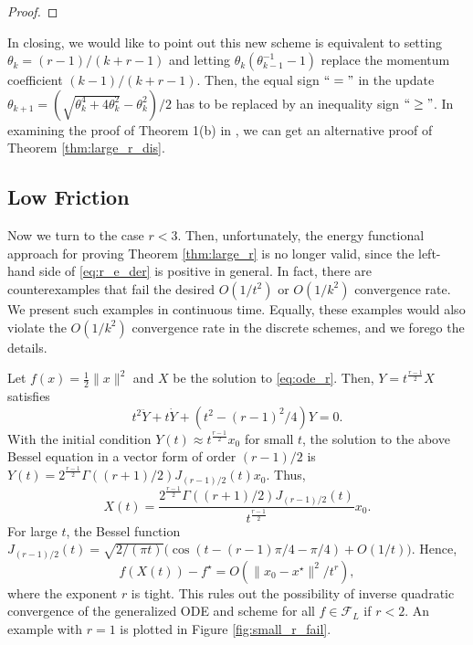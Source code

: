 \documentclass[twoside,11pt]{article}
\begin{document}
\begin{proof}
\end{proof}

In closing, we would like to point out this new scheme is equivalent to setting $\theta_k = (r-1)/(k+r-1)$ and letting $\theta_k(\theta_{k-1}^{-1} - 1)$ replace the momentum coefficient $(k-1)/(k+r-1)$. Then, the equal sign $``="$ in the update $\theta_{k+1} = (\sqrt{\theta_k^4 + 4\theta_k^2} - \theta_k^2 )/2$ has to be replaced by an inequality sign $``\ge"$. In examining the proof of Theorem 1(b) in \cite{tsengapprox}, we can get an alternative proof of Theorem \ref{thm:large_r_dis}.



\subsection{Low Friction}
\label{sec:low-friction}
Now we turn to the case $r < 3$. Then, unfortunately, the energy functional approach for proving Theorem \ref{thm:large_r} is no longer valid, since the left-hand side of \eqref{eq:r_e_der} is positive in general. In fact, there are counterexamples that fail the desired $O(1/t^2)$ or $O(1/k^2)$ convergence rate. We present such examples in continuous time. Equally, these examples would also violate the $O(1/k^2)$ convergence rate in the discrete schemes, and we forego the details.

Let $f(x) = \frac12\|x\|^2$ and $X$ be the solution to \eqref{eq:ode_r}. Then, $Y = t^{\frac{r-1}{2}}X$ satisfies
\begin{equation}\nonumber
t^2\ddot Y + t\dot Y + (t^2 - (r-1)^2/4)Y = 0.
\end{equation}
With the initial condition $Y(t) \approx t^{\frac{r-1}{2}}x_0$ for small $t$, the solution to the above Bessel equation in a vector form of order $(r-1)/2$ is $Y(t) = 2^{\frac{r-1}{2}}\Gamma((r+1)/2)J_{(r-1)/2}(t)x_0$. Thus,
\begin{equation}\nonumber
X(t) = \frac{2^{\frac{r-1}{2}}\Gamma((r+1)/2)J_{(r-1)/2}(t)}{t^{\frac{r-1}{2}}}x_0.
\end{equation}
For large $t$, the Bessel function $J_{(r-1)/2}(t) = \sqrt{2/(\pi t)}\big( \cos(t-(r-1)\pi/4-\pi/4) + O(1/t) \big)$. Hence,
\begin{equation}\nonumber
f(X(t)) - f^\star = O\left( \|x_0 - x^\star\|^2/t^r \right),
\end{equation}
where the exponent $r$ is tight. This rules out the possibility of inverse quadratic convergence of the generalized ODE and scheme for all $f \in \mathcal{F}_L$ if $r < 2$. An example with $r = 1$ is plotted in Figure \ref{fig:small_r_fail}.
\end{document}
